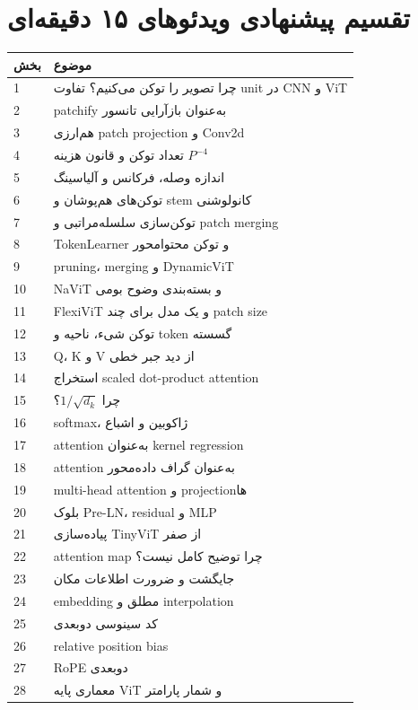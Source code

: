 \documentclass[12pt,openany,oneside]{book}
\begin{document}
\section{تقسیم پیشنهادی ویدئوهای ۱۵ دقیقه‌ای}
\begin{videobox}
\begin{longtable}{p{12mm}p{122mm}}
\toprule
بخش & موضوع \\
\midrule
1 & چرا تصویر را توکن می‌کنیم؟ تفاوت unit در CNN و ViT \\
2 & patchify به‌عنوان بازآرایی تانسور \\
3 & هم‌ارزی patch projection و Conv2d \\
4 & تعداد توکن و قانون هزینه $P^{-4}$ \\
5 & اندازه وصله، فرکانس و آلیاسینگ \\
6 & توکن‌های هم‌پوشان و stem کانولوشنی \\
7 & توکن‌سازی سلسله‌مراتبی و patch merging \\
8 & TokenLearner و توکن محتوامحور \\
9 & pruning، merging و DynamicViT \\
10 & NaViT و بسته‌بندی وضوح بومی \\
11 & FlexiViT و یک مدل برای چند patch size \\
12 & توکن شیء، ناحیه و token گسسته \\
13 & Q، K و V از دید جبر خطی \\
14 & استخراج scaled dot-product attention \\
15 & چرا $1/\sqrt{d_k}$؟ \\
16 & softmax، ژاکوبین و اشباع \\
17 & attention به‌عنوان kernel regression \\
18 & attention به‌عنوان گراف داده‌محور \\
19 & multi-head attention و projectionها \\
20 & بلوک Pre-LN، residual و MLP \\
21 & پیاده‌سازی TinyViT از صفر \\
22 & attention map چرا توضیح کامل نیست؟ \\
23 & جایگشت و ضرورت اطلاعات مکان \\
24 & embedding مطلق و interpolation \\
25 & کد سینوسی دوبعدی \\
26 & relative position bias \\
27 & RoPE دوبعدی \\
28 & معماری پایه ViT و شمار پارامتر \\

\end{longtable}
\end{videobox}
\end{document}

